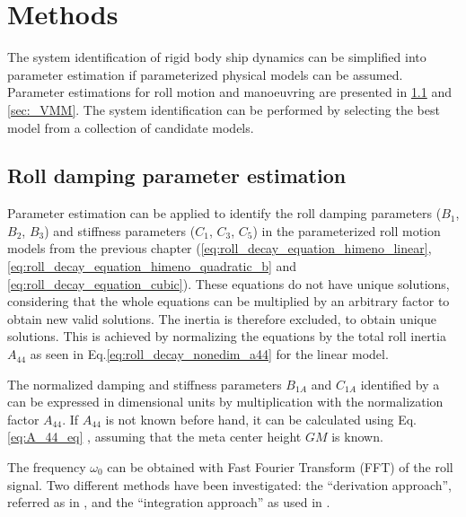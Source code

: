 \chapter{Methods\label{ch:methods}}
The system identification of rigid body ship dynamics can be simplified into parameter estimation if parameterized physical models can be assumed. Parameter estimations for roll motion and manoeuvring are presented in \ref{sec:_roll} and \ref{sec:_VMM}. The system identification can be performed by selecting the best model from a collection of candidate models.

\section{Roll damping parameter estimation} \label{sec:_roll}
\noindent Parameter estimation can be applied to identify the roll damping parameters ($B_1$, $B_2$, $B_3$) and stiffness parameters ($C_1$, $C_3$, $C_5$) in the parameterized roll motion models from the previous chapter (\autoref{eq:roll_decay_equation_himeno_linear}, \autoref{eq:roll_decay_equation_himeno_quadratic_b} and \autoref{eq:roll_decay_equation_cubic}). These equations do not have unique solutions, considering that the whole equations can be multiplied by an arbitrary factor to obtain new valid solutions. The inertia is therefore excluded, to obtain unique solutions. This is achieved by normalizing the equations by the total roll inertia $A_{44}$ as seen in Eq.\ref{eq:roll_decay_nonedim_a44} for the linear model.



\noindent The normalized damping and stiffness parameters $B_{1A}$ and $C_{1A}$ identified by a  can be expressed in dimensional units by multiplication with the normalization factor $A_{44}$. If $A_{44}$ is not known before hand, it can be calculated using Eq.\ref{eq:A_44_eq} \cite{piehl_ship_2016}, assuming that the meta center height $GM$ is known.


\noindent The frequency $\omega_0$ can be obtained with Fast Fourier Transform (FFT) of the roll signal. 
Two different  methods have been investigated: the ``derivation approach'', referred as  in \parencite{imo_1200_2006}, and the ``integration approach'' as used in \cite{soder_assessment_2019}. 

